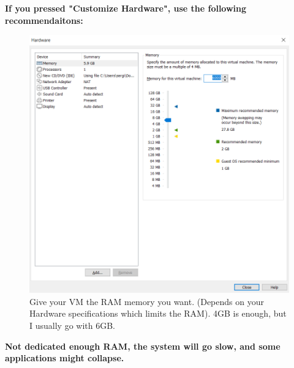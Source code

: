 \documentclass[a4paper]{article}
\begin{document}
    \clearpage
    \begin{tcolorbox}[colback=green!5!white,colframe=green!75!black]
        \centering
        \textbf{If you pressed "Customize Hardware", use the following recommendaitons:}
    \end{tcolorbox}

    \vspace{0.5cm}

    \begin{figure} [h]
        \centering
        \includegraphics[width=\textwidth, keepaspectratio]{Images/Create_VM/Creating_VM_6.png}
        \caption{Give your VM the RAM memory you want. (Depends on your Hardware specifications which limits the RAM).
        4GB is enough, but I usually go with 6GB.}    
    \end{figure}

    \vspace{0.5cm}

    \begin{tcolorbox}[colback=red!5!white,colframe=red!75!black]
        \centering
        \textbf{Not dedicated enough RAM, the system will go slow, and some applications might collapse.}
    \end{tcolorbox}
\end{document}
